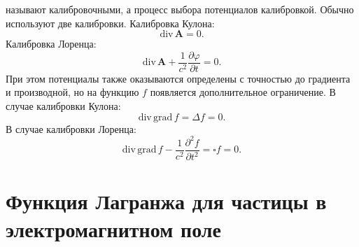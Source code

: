 \documentclass[a4paper,14pt]{extreport} %
\newcommand{\dff}[2]{\frac{\partial #1}{\partial #2}}
\newcommand{\dfs}[2]{\frac{\partial^2 #1}{\partial #2^2}}
\renewcommand{\vec}[1]{\bm{#1}}
\renewcommand{\div}{\mathrm{div}\,}
\newcommand{\grad}{\mathrm{grad}\,}
\begin{document}
	называют калибровочными, а процесс выбора потенциалов калибровкой. Обычно используют две калибровки. Калибровка Кулона:
	\begin{equation*}
		\div \vec{A} = 0.
	\end{equation*}
	Калибровка Лоренца:
	\begin{equation*}
		\div \vec{A} + \frac{1}{c^2}\dff{\varphi}{t} = 0.
	\end{equation*}
	При этом потенциалы также оказываются определены с точностью до градиента и производной, но на функцию $f$ появляется дополнительное ограничение. В случае калибровки Кулона:
	\begin{equation*}
		\div \grad f = \Delta f = 0.
	\end{equation*}
	В случае калибровки Лоренца:
	\begin{equation*}
		\div \grad f - \frac{1}{c^2}\dfs{f}{t} = \square f = 0.
	\end{equation*}
	
	\section{Функция Лагранжа для частицы в электромагнитном поле}
	
\end{document}

